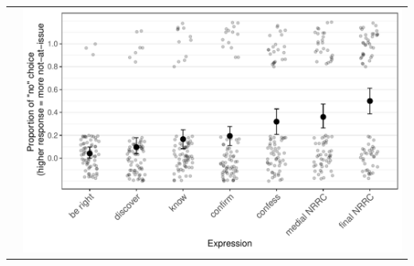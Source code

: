 \documentclass[compress, xcolor = dvipsnames, aspectratio=169]{beamer}
\begin{document}
\begin{frame}[t]
\begin{tabular}{p{.4\linewidth} p{.4\linewidth}}
      		&
      		\includegraphics[width=\linewidth]{../../results/exp4/graphs/mean-ratings.pdf}
      		\\
		\end{tabular}
	
	\end{frame}
\end{document}
